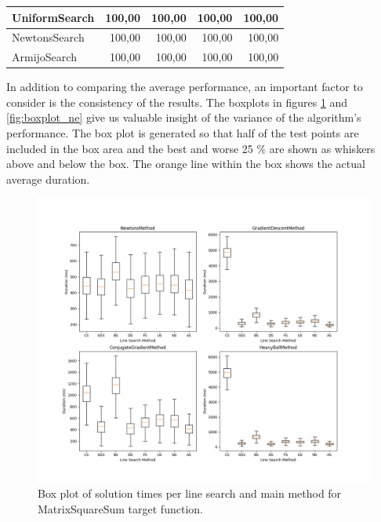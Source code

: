 \documentclass[a4paper,english,titlepage,12pt]{article}
\begin{document}
\begin{table}[H]
\begin{tabular}{|l|r|r|r|r|}
    UniformSearch                                                             & 100,00                                                   & 100,00                                                    & 100,00                                                    & 100,00                                                    \\ \hline
    NewtonsSearch                                                             & 100,00                                                   & 100,00                                                    & 100,00                                                    & 100,00                                                    \\ \hline
    ArmijoSearch                                                              & 100,00                                                   & 100,00                                                    & 100,00                                                    & 100,00                                                    \\ \hline
    \end{tabular}
\end{table}


In addition to comparing the average performance, an important factor to consider is the consistency of the results. The boxplots in figures \ref{fig:boxplot_mss} and \ref{fig:boxplot_ne} give us valuable insight of the variance of the algorithm's performance. The box plot is generated so that half of the test points are included in the box area and the best and worse 25 \% are shown as whiskers above and below the box. The orange line within the box shows the actual average duration.


\begin{figure}[H]
	\centering
	\includegraphics[width=1.0\textwidth]{images/boxplot_mss.png}
	\caption{Box plot of solution times per line search and main method for MatrixSquareSum target function.}
	\label{fig:boxplot_mss}
\end{figure}
\end{document}
